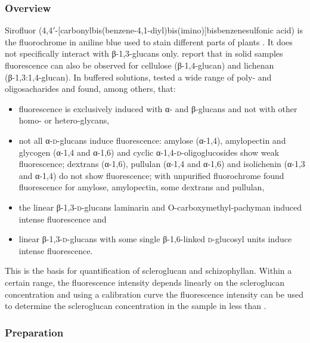 \subsubsection{Overview}
Sirofluor (4,4$'$-[carbonylbis(benzene-4,1-diyl)bis(imino)]bisbenzenesulfonic acid) is the fluorochrome in aniline blue \cite{Evans1982} used to stain different parts of plants \cite{Smith1978}. It does not specifically interact with β-1,3-glucans only. \textcite{Smith1978} report that in solid samples fluorescence can also be observed for cellulose (β-1,4-glucan) and lichenan (β-1,3:1,4-glucan). In buffered solutions, \textcite{Evans1984} tested a wide range of poly- and oligosacharides and found, among others, that:
\begin{itemize}
	\item fluorescence is exclusively induced with α- and β-glucans and not with other homo- or hetero-glycans,
	\item not all α-\textsc{d}-glucans induce fluorescence: amylose (α-1,4), amylopectin and glycogen (α-1,4 and α-1,6) and cyclic α-1,4-\textsc{d}-oligoglucosides show weak fluorescence; dextrans (α-1,6), pullulan (α-1,4 and α-1,6) and isolichenin (α-1,3 and α-1,4) do not show fluorescence; with unpurified fluorochrome \textcite{Faulkner1973} found fluores­cence for amylose, amylopectin, some dextrans and pullulan,
	\item the linear β-1,3-\textsc{d}-glucans laminarin and O-carboxymethyl-pachyman induced intense fluorescence and
	\item linear β-1,3-\textsc{d}-glucans with some single β-1,6-linked \textsc{d}-glucosyl units induce intense fluorescence.
\end{itemize}
This is the basis for quantification of scleroglucan and schizophyllan. Within a certain range, the fluorescence intensity depends linearly on the scleroglucan concentration and using a calibration curve the fluorescence intensity can be used to determine the scleroglucan concentration in the sample in less than .

\subsubsection{Preparation}
